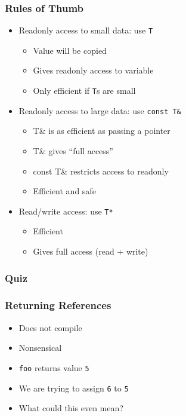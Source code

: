 \begin{frame}
  \frametitle{Rules of Thumb}
  \begin{itemize}
    \item Readonly access to small data: use {\tt T}
          \begin{itemize}
            \item Value will be copied
            \item Gives readonly access to variable
            \item Only efficient if {\tt T}s are small
          \end{itemize}
    \item Readonly access to large data: use {\tt const T\&}
          \begin{itemize}
            \item {T\&} is as efficient as passing a pointer
            \item {T\&} gives ``full access''
            \item {const T\&} restricts access to readonly
            \item Efficient and safe
          \end{itemize}
    \item Read/write access: use {\tt T*}
          \begin{itemize}
            \item Efficient
            \item Gives full access (read + write)
          \end{itemize}
  \end{itemize}  
\end{frame}

\begin{frame}
  \frametitle{Quiz}
\end{frame}

\begin{frame}
  \frametitle{Returning References}
  \begin{itemize}
    \item Does not compile
    \item Nonsensical
    \item {\tt foo} returns value {\tt 5}
    \item We are trying to assign {\tt 6} to {\tt 5}
    \item What could this even mean?
  \end{itemize}
\end{frame}

